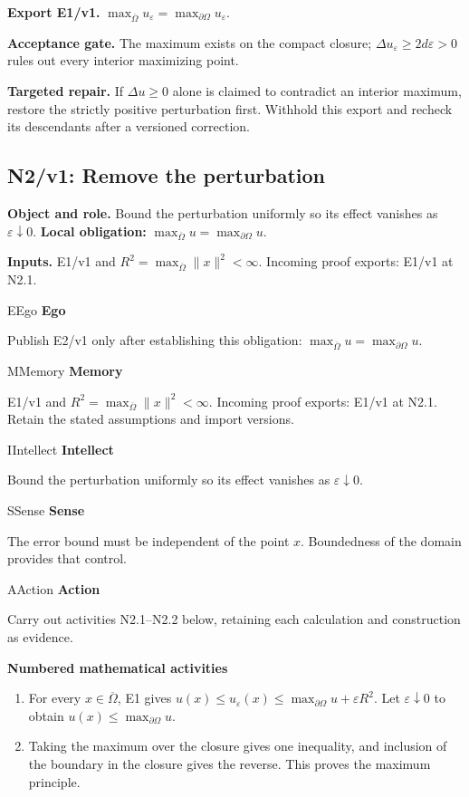 \documentclass[preprint,12pt,aps,pra,showkeys,amsmath,amssymb,superscriptaddress,floatfix]{revtex4-2}
\theoremstyle{definition}
\theoremstyle{remark}
\newcommand{\mmfaculty}[3]{%
 \begin{mmfacultybox}{#1}{#2}
 {\sffamily\bfseries\color{MMBlue}#2}\par\smallskip #3
 \end{mmfacultybox}}
\newcommand{\field}[2]{\par\smallskip\noindent\textbf{#1.} #2\par}
\begin{document}
\field{Export E1/v1}{\(\max_{\overline\Omega}u_\varepsilon=\max_{\partial\Omega}u_\varepsilon\).}

\field{Acceptance gate}{The maximum exists on the compact closure;
\(\Delta u_\varepsilon\ge2d\varepsilon>0\) rules out every interior
maximizing point.}

\field{Targeted repair}{If \(\Delta u\ge0\) alone is claimed to contradict an interior maximum,
restore the strictly positive perturbation first. Withhold this export
and recheck its descendants after a versioned correction.}

\clearpage

\subsection{N2/v1: Remove the perturbation}

\field{Object and role}{Bound the perturbation uniformly so its effect vanishes as
\(\varepsilon\downarrow0\). \textbf{Local obligation:}
\(\max_{\overline\Omega}u=\max_{\partial\Omega}u\).}

\field{Inputs}{E1/v1 and \(R^2=\max_{\overline\Omega}\|x\|^2<\infty\). Incoming proof
exports: E1/v1 at N2.1.}

\mmfaculty{E}{Ego}{Publish E2/v1 only after establishing this obligation:
\(\max_{\overline\Omega}u=\max_{\partial\Omega}u\).}

\mmfaculty{M}{Memory}{E1/v1 and \(R^2=\max_{\overline\Omega}\|x\|^2<\infty\). Incoming proof
exports: E1/v1 at N2.1. Retain the stated assumptions and import
versions.}

\mmfaculty{I}{Intellect}{Bound the perturbation uniformly so its effect vanishes as
\(\varepsilon\downarrow0\).}

\mmfaculty{S}{Sense}{The error bound must be independent of the point \(x\). Boundedness of
the domain provides that control.}

\mmfaculty{A}{Action}{Carry out activities N2.1--N2.2 below, retaining each calculation and
construction as evidence.}

\smallskip\noindent\textbf{Numbered mathematical activities}

\begin{enumerate}[label=N2.\arabic*,leftmargin=3.4em]

\item For every \(x\in\overline\Omega\), E1 gives
\(u(x)\le u_\varepsilon(x)\le\max_{\partial\Omega}u+\varepsilon R^2\).
Let \(\varepsilon\downarrow0\) to obtain
\(u(x)\le\max_{\partial\Omega}u\).

\item Taking the maximum over the closure gives one inequality, and inclusion
of the boundary in the closure gives the reverse. This proves the
maximum principle.

\end{enumerate}
\end{document}
